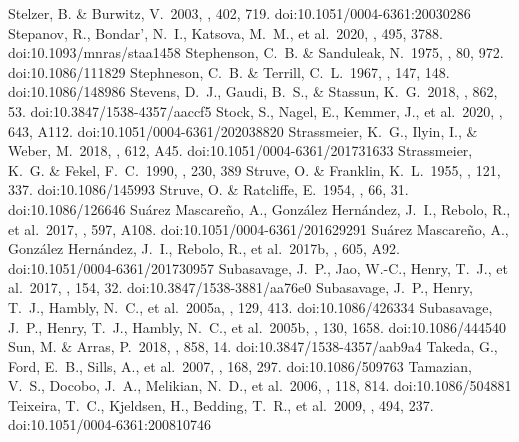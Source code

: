 \documentclass[twocolumn,tighten,twocolappendix]{aastex631}
\begin{document}
\begin{thebibliography}{}
 Stelzer, B. \& Burwitz, V.\ 2003, \aap, 402, 719. doi:10.1051/0004-6361:20030286
 Stepanov, R., Bondar', N.~I., Katsova, M.~M., et al.\ 2020, \mnras, 495, 3788. doi:10.1093/mnras/staa1458
 Stephenson, C.~B. \& Sanduleak, N.\ 1975, \aj, 80, 972. doi:10.1086/111829
 Stephneson, C.~B. \& Terrill, C.~L.\ 1967, \apj, 147, 148. doi:10.1086/148986
 Stevens, D.~J., Gaudi, B.~S., \& Stassun, K.~G.\ 2018, \apj, 862, 53. doi:10.3847/1538-4357/aaccf5
 Stock, S., Nagel, E., Kemmer, J., et al.\ 2020, \aap, 643, A112. doi:10.1051/0004-6361/202038820
 Strassmeier, K.~G., Ilyin, I., \& Weber, M.\ 2018, \aap, 612, A45. doi:10.1051/0004-6361/201731633
 Strassmeier, K.~G. \& Fekel, F.~C.\ 1990, \aap, 230, 389
 Struve, O. \& Franklin, K.~L.\ 1955, \apj, 121, 337. doi:10.1086/145993
 Struve, O. \& Ratcliffe, E.\ 1954, \pasp, 66, 31. doi:10.1086/126646
 Su{\'a}rez Mascare{\~n}o, A., Gonz{\'a}lez Hern{\'a}ndez, J.~I., Rebolo, R., et al.\ 2017, \aap, 597, A108. doi:10.1051/0004-6361/201629291
 Su{\'a}rez Mascare{\~n}o, A., Gonz{\'a}lez Hern{\'a}ndez, J.~I., Rebolo, R., et al.\ 2017b, \aap, 605, A92. doi:10.1051/0004-6361/201730957
 Subasavage, J.~P., Jao, W.-C., Henry, T.~J., et al.\ 2017, \aj, 154, 32. doi:10.3847/1538-3881/aa76e0
 Subasavage, J.~P., Henry, T.~J., Hambly, N.~C., et al.\ 2005a, \aj, 129, 413. doi:10.1086/426334
 Subasavage, J.~P., Henry, T.~J., Hambly, N.~C., et al.\ 2005b, \aj, 130, 1658. doi:10.1086/444540
 Sun, M. \& Arras, P.\ 2018, \apj, 858, 14. doi:10.3847/1538-4357/aab9a4
 Takeda, G., Ford, E.~B., Sills, A., et al.\ 2007, \apjs, 168, 297. doi:10.1086/509763
 Tamazian, V.~S., Docobo, J.~A., Melikian, N.~D., et al.\ 2006, \pasp, 118, 814. doi:10.1086/504881
 Teixeira, T.~C., Kjeldsen, H., Bedding, T.~R., et al.\ 2009, \aap, 494, 237. doi:10.1051/0004-6361:200810746

\end{thebibliography}
\end{document}
